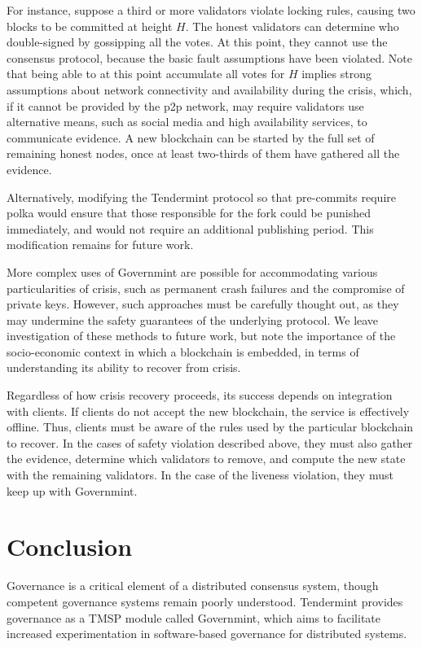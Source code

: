 For instance, suppose a third or more validators violate locking rules,
causing two blocks to be committed at height $H$.
The honest validators can determine who double-signed by gossipping all the votes.
At this point, they cannot use the consensus protocol, because the basic fault assumptions have been violated.
Note that being able to at this point accumulate all votes for $H$ 
implies strong assumptions about network connectivity and availability during the crisis,
which, if it cannot be provided by the p2p network, may require validators use alternative means, 
such as social media and high availability services, to communicate evidence.
A new blockchain can be started by the full set of remaining honest nodes, 
once at least two-thirds of them have gathered all the evidence.

Alternatively, modifying the Tendermint protocol so that pre-commits require polka
would ensure that those responsible for the fork could be punished immediately,
and would not require an additional publishing period. 
This modification remains for future work.

More complex uses of Governmint are possible for accommodating various particularities of crisis,
such as permanent crash failures and the compromise of private keys.
However, such approaches must be carefully thought out, 
as they may undermine the safety guarantees of the underlying protocol.
We leave investigation of these methods to future work, 
but note the importance of the socio-economic context in which a blockchain is embedded, in terms of understanding its ability to recover from crisis.

Regardless of how crisis recovery proceeds, its success depends on integration with clients.
If clients do not accept the new blockchain, the service is effectively offline.
Thus, clients must be aware of the rules used by the particular blockchain to recover.
In the cases of safety violation described above, they must also gather the evidence,
determine which validators to remove, and compute the new state with the remaining validators.
In the case of the liveness violation, they must keep up with Governmint.

\section{Conclusion}

Governance is a critical element of a distributed consensus system, 
though competent governance systems remain poorly understood.
Tendermint provides governance as a TMSP module called Governmint,
which aims to facilitate increased experimentation in software-based governance for distributed systems.

